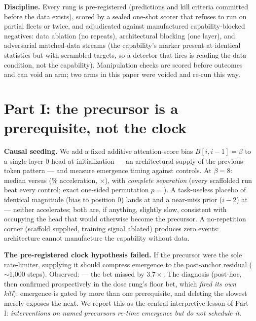 \documentclass[11pt]{article}
\begin{document}
\textbf{Discipline.} Every rung is pre-registered (predictions and kill criteria
committed before the data exists), scored by a sealed one-shot scorer that refuses to
run on partial fleets or twice, and adjudicated against manufactured
capability-blocked negatives: data ablation (no repeats), architectural blocking (one
layer), and adversarial matched-data streams (the capability's marker present at
identical statistics but with scrambled targets, so a detector that fires is reading
the data condition, not the capability). Manipulation checks are scored before
outcomes and can void an arm; two arms in this paper were voided and re-run this way.

\section{Part I: the precursor is a prerequisite, not the clock}
\label{sec:p7}
\textbf{Causal seeding.} We add a fixed additive attention-score bias
$B[i,i{-}1]{=}\beta$ to a single layer-0 head at initialization --- an architectural
supply of the previous-token pattern --- and measure emergence timing against
\PsevenCtrlN{} controls. At $\beta{=}8$: median \PsevenHardMed{} versus
\PsevenTzero{} (\PsevenAccelPct\% acceleration, \PsevenSpeedup$\times$), with
\emph{complete separation} (every scaffolded run beat every control; exact one-sided
permutation $p={}$\PsevenExactP). A task-useless placebo of identical magnitude
(bias to position 0) lands at \PsevenSinkMed{} and a near-miss prior ($i{-}2$) at
\PsevenNearMed{} --- neither accelerates; both are, if anything, slightly slow,
consistent with occupying the head that would otherwise become the precursor. A
no-repetition corner (scaffold supplied, training signal ablated) produces zero
events: architecture cannot manufacture the capability without data.

\textbf{The pre-registered clock hypothesis failed.} If the precursor were the sole
rate-limiter, supplying it should compress emergence to the post-anchor residual
($\sim$1{,}000 steps). Observed: \PsevenHardMed{} --- the bet missed by
$3.7\times$. The diagnosis (post-hoc, then confirmed prospectively in the dose rung's
floor bet, which \emph{fired its own kill}): emergence is gated by more than one
prerequisite, and deleting the slowest merely exposes the next. We report this as the
central interpretive lesson of Part I: \emph{interventions on named precursors
re-time emergence but do not schedule it}.
\end{document}
